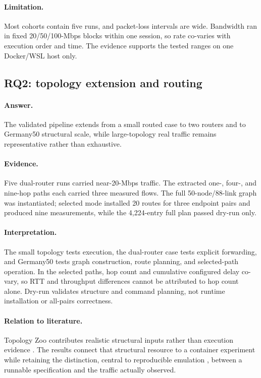 \paragraph{Limitation.} Most cohorts contain five runs, and packet-loss intervals are wide. Bandwidth ran in fixed 20/50/100-Mbps blocks within one session, so rate co-varies with execution order and time. The evidence supports the tested ranges on one Docker/WSL host only.

\subsection{RQ2: topology extension and routing}

\paragraph{Answer.} The validated pipeline extends from a small routed case to two routers and to Germany50 structural scale, while large-topology real traffic remains representative rather than exhaustive.

\paragraph{Evidence.} Five dual-router runs carried near-20-Mbps traffic. The extracted one-, four-, and nine-hop paths each carried three measured flows. The full 50-node/88-link graph was instantiated; selected mode installed 20 routes for three endpoint pairs and produced nine measurements, while the 4,224-entry full plan passed dry-run only.

\paragraph{Interpretation.} The small topology tests execution, the dual-router case tests explicit forwarding, and Germany50 tests graph construction, route planning, and selected-path operation. In the selected paths, hop count and cumulative configured delay co-vary, so RTT and throughput differences cannot be attributed to hop count alone. Dry-run validates structure and command planning, not runtime installation or all-pairs correctness.

\paragraph{Relation to literature.} Topology Zoo contributes realistic structural inputs rather than execution evidence \citep{knight2011topologyzoo}. The results connect that structural resource to a container experiment while retaining the distinction, central to reproducible emulation \citep{handigol2012reproducible}, between a runnable specification and the traffic actually observed.

